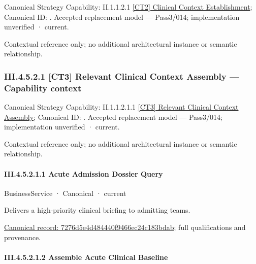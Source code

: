 {\small Canonical Strategy Capability: II.1.1.2.1 \hyperref[element:7b398aa81bbc43e7a3868e5d85e30a1d]{[CT2] Clinical Context Establishment}; Canonical ID: \texttt{}. Accepted replacement model — Pass3/014; implementation unverified · current.}\par
Contextual reference only; no additional architectural instance or semantic relationship.\par
\subsubsection*{III.4.5.2.1 [CT3] Relevant Clinical Context Assembly — Capability context}
\label{navigation:III.4.5.2.1}

{\small Canonical Strategy Capability: II.1.1.2.1.1 \hyperref[element:32bdf554780d4d6081fc3726fbba11df]{[CT3] Relevant Clinical Context Assembly}; Canonical ID: \texttt{}. Accepted replacement model — Pass3/014; implementation unverified · current.}\par
Contextual reference only; no additional architectural instance or semantic relationship.\par
\paragraph*{III.4.5.2.1.1 Acute Admission Dossier Query}
\label{navigation:III.4.5.2.1.1}

\label{element:7276d5e4d484440f9466ec24c183bdab}
{\small BusinessService · Canonical · current}\par

Delivers a high-priority clinical briefing to admitting teams.


{\footnotesize \href{../../../../../../../../continuum/business/business-service/7276d5e4d484440f9466ec24c183bdab.md}{Canonical record: 7276d5e4d484440f9466ec24c183bdab}; full qualifications and provenance.}\par
\paragraph*{III.4.5.2.1.2 Assemble Acute Clinical Baseline}
\label{navigation:III.4.5.2.1.2}

